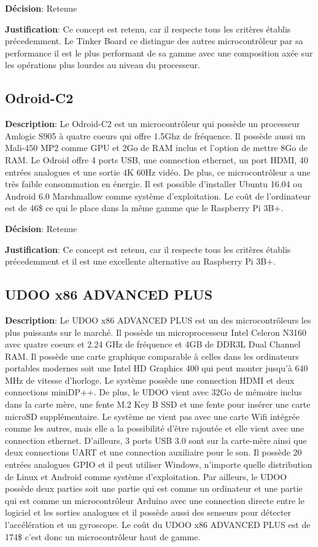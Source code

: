 \textbf{Décision}: Retenue

\textbf{Justification}: Ce concept est retenu, car il respecte tous les critères établis précedemment. Le Tinker Board ce distingue des autres microcontrôleur par sa performance il est le plus performant de sa gamme avec une composition axée sur les opérations plus lourdes au niveau du processeur.

\subsection {Odroid-C2}

\textbf{Description}:
Le Odroid-C2 est un microcontrôleur qui possède un processeur Amlogic S905 à quatre coeurs qui offre 1.5Ghz de fréquence. Il possède aussi un Mali-450 MP2 comme GPU et 2Go de RAM inclus et l’option de mettre 8Go de RAM. Le Odroid offre 4 ports USB, une connection ethernet, un port HDMI, 40 entrées analogues et une sortie 4K 60Hz vidéo. De plus, ce microcontrôleur a une très faible consommation en énergie. Il est possible d’installer Ubuntu 16.04 ou Android 6.0 Marshmallow comme système d’exploitation. Le coût de l’ordinateur est de 46\$ ce qui le place dans la même gamme que le Raspberry Pi 3B+.

\textbf{Décision}: Retenue

\textbf{Justification}: Ce concept est retenu, car il respecte tous les critères établis précedemment et il est une excellente alternative au Raspberry Pi 3B+.

\subsection {UDOO x86 ADVANCED PLUS}

\textbf{Description}: Le UDOO x86 ADVANCED PLUS est un des microcontrôleurs les plus puissants sur le marché. Il possède un microprocesseur Intel Celeron N3160 avec quatre coeurs et 2.24 GHz de fréquence et 4GB de DDR3L Dual Channel RAM. Il possède une carte graphique comparable à celles dans les ordinateurs portables modernes soit une Intel HD Graphics 400 qui peut monter jusqu’à 640 MHz de vitesse d’horloge. Le système possède une connection HDMI et deux connections miniDP++. De plus, le UDOO vient avec 32Go de mémoire inclus dans la carte mère, une fente M.2 Key B SSD et une fente pour insérer une carte microSD supplémentaire. Le système ne vient pas avec une carte Wifi intégrée comme les autres, mais elle a la possibilité d’être rajoutée et elle vient avec une connection ethernet. D’ailleurs, 3 ports USB 3.0 sont sur la carte-mère ainsi que deux connections UART et une connection auxiliaire pour le son. Il possède 20 entrées analogues GPIO et il peut utiliser Windows, n’importe quelle distribution de Linux et Android comme système d’exploitation. Par ailleurs, le UDOO possède deux parties soit une partie qui est comme un ordinateur et une partie qui est comme un microcontrôleur Arduino avec une connection directe entre le logiciel et les sorties analogues et il possède aussi des senseurs pour détecter l’accélération et un gyroscope. Le coût du UDOO x86 ADVANCED PLUS est de 174\$ c’est donc un microcontrôleur haut de gamme.

